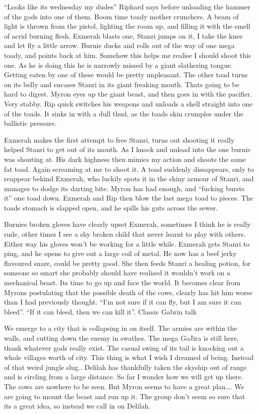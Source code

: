 “Looks like its wednesday my dudes” Riphard says before unloading the hammer of the gods into one of them. Boom time toady mother crunchers. A beam of light is thrown from the pistol, lighting the room up, and filling it with the smell of acrid burning flesh. Exmerah blasts one, Stanri jumps on it, I take the knee and let fly a little arrow. Burnie ducks and rolls out of the way of one mega toady, and points back at him. Somehow this helps me realise I should shoot this one. As he is doing this he is narrowly missed by a giant slathering tongue. Getting eaten by one of these would be pretty unpleasant. The other toad turns on its belly and encases Stanri in its giant freaking mouth. Thats going to be hard to digest. Myron eyes up the giant beast, and then goes in with the pacifier. Very stabby. Rip quick switches his weapons and unloads a shell straight into one of the toads. It sinks in with a dull thud, as the toads skin crumples under the ballistic pressure.\medskip

Exmerah makes the first attempt to free Stanri, turns out shooting it really helped Stanri to get out of its mouth. As I knock and unload into the one burnie was shouting at. His dark highness then mimics my action and shoots the same fat toad. Again screaming at me to shoot it. A toad suddenly dissappears, only to reappear behind Exmerah, who luckily spots it in the shiny armour of Stanri, and manages to dodge its darting bite. Myron has had enough, and “fucking bursts it” one toad down. Exmerah and Rip then blow the last mega toad to pieces. The toads stomach is slapped open, and he spills his guts across the sewer.\medskip

Burnies broken gloves have clearly upset Exmerah, sometimes I think he is really rude, other times I see a shy broken child that never learnt to play with others. Either way his gloves won’t be working for a little while. Exmerah gets Stanri to ping, and he opens to give out a large coil of metal. He now has a beef jerky flavoured snare, could be pretty good. She then feeds Stanri a healing potion, for someone so smart she probably should have realised it wouldn’t work on a mechanical beast. Its time to go up and face the world. It becomes clear from Myrons postulating that the possible death of the cows, clearly has hit him worse than I had previously thought. “I’m not sure if it can fly, but I am sure it can bleed”. “If it can bleed, then we can kill it”. Classic Gabrin talk \medskip

We emerge to a city that is collapsing in on itself. The armies are within the walls, and cutting down the enemy in swathes. The mega GoJira is still here, thank whatever gods really exist. The casual swing of its tail is knocking out a whole villages worth of city. This thing is what I wish I dreamed of being. Instead of that weird jungle slug.. Delilah has thankfully taken the skyship out of range and is circling from a large distance. So far I wonder how we will get up there. The cows are nowhere to be seen. But Myron seems to have a great plan…. We are going to mount the beast and run up it. The group don’t seem so sure that its a great idea, so instead we call in on Delilah.\medskip

